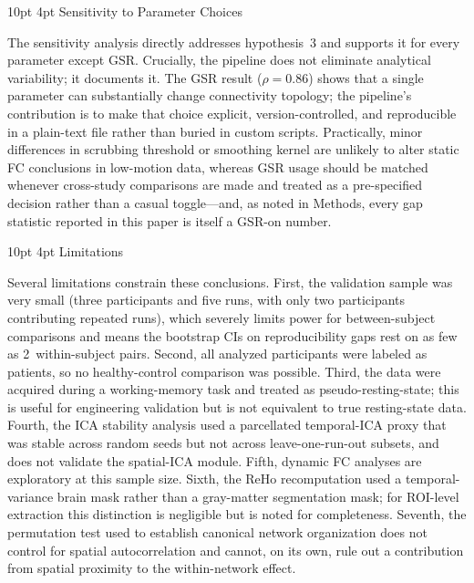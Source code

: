 \documentclass[12pt]{article}
\makeatletter
\renewcommand\subsection{%
  \@startsection{subsection}{2}{\z@}%
    {10pt \@plus 2pt \@minus 1pt}%
    {4pt}%
    {\normalfont\normalsize\bfseries}}
\makeatother
\begin{document}
\subsection{Sensitivity to Parameter Choices}

The sensitivity analysis directly addresses hypothesis~3 and supports it
for every parameter except GSR. Crucially, the pipeline does not
eliminate analytical variability; it documents it. The GSR result
($\rho = 0.86$) shows that a single parameter can substantially change
connectivity topology; the pipeline's contribution is to make that
choice explicit, version-controlled, and reproducible in a plain-text
file rather than buried in custom scripts. Practically, minor
differences in scrubbing threshold or smoothing kernel are unlikely to
alter static FC conclusions in low-motion data, whereas GSR usage should
be matched whenever cross-study comparisons are made and treated as a
pre-specified decision rather than a casual toggle---and, as noted in
Methods, every gap statistic reported in this paper is itself a
GSR-on number.

\subsection{Limitations}

Several limitations constrain these conclusions. First, the validation
sample was very small (three participants and five runs, with only two
participants contributing repeated runs), which severely limits power
for between-subject comparisons and means the bootstrap CIs on
reproducibility gaps rest on as few as 2~within-subject pairs. Second,
all analyzed participants were labeled as patients, so no
healthy-control comparison was possible. Third, the data were acquired
during a working-memory task and treated as pseudo-resting-state; this
is useful for engineering validation but is not equivalent to true
resting-state data. Fourth, the ICA stability analysis used a
parcellated temporal-ICA proxy that was stable across random seeds but
not across leave-one-run-out subsets, and does not validate the
spatial-ICA module. Fifth, dynamic FC analyses are exploratory at this
sample size. Sixth, the ReHo recomputation used a temporal-variance
brain mask rather than a gray-matter segmentation mask; for ROI-level
extraction this distinction is negligible but is noted for
completeness. Seventh, the permutation test used to establish canonical
network organization does not control for spatial autocorrelation and
cannot, on its own, rule out a contribution from spatial proximity to
the within-network effect.
\end{document}
